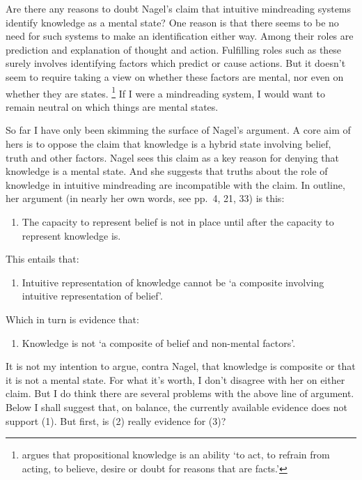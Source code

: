 \documentclass[11pt,a4paper]{extarticle}
\begin{document}
Are there any reasons to doubt  Nagel's claim that intuitive mindreading systems identify knowledge as a mental state?
One reason is that there seems to be no need for such systems to make an identification either way.
Among their roles are prediction and explanation of thought and action.
Fulfilling roles such as these surely involves identifying factors which predict or cause actions. 
But it doesn't seem to require taking a view on whether these factors are mental, nor even on whether they are states.%
\footnote{
\citet[p.\ 451]{Hyman:1999fk} argues that propositional knowledge is an ability `to act, to refrain from acting, to believe, desire or doubt for reasons that are facts.' 
}
If I were a mindreading system, I would want to remain neutral on which things are mental states.

So far I have only been skimming the surface of Nagel's argument.
A core aim of hers is to oppose the claim that knowledge is a hybrid state involving belief, truth and other factors.
Nagel sees this claim as a key reason for denying that knowledge is a mental state.
And she suggests that truths about the role of knowledge in intuitive mindreading are incompatible with the claim.
In outline, her argument (in nearly her own words, see pp.\ 4, 21, 33) is this:
%
\begin{enumerate}
\item The capacity to represent belief is not in place until after the capacity to represent knowledge is.
\end{enumerate}
This entails that:
\begin{enumerate}[resume]
\item Intuitive representation of knowledge cannot be `a composite involving intuitive representation of belief'.
\end{enumerate}
Which in turn is evidence that:
\begin{enumerate}[resume]
\item Knowledge is not `a composite of belief and non-mental factors'.
\end{enumerate}
%
It is not my intention to argue, contra Nagel, that knowledge is composite or that it is not a mental state.
For what it's worth,
I don't disagree with her on either claim.
But I do think there are several problems with the above line of argument.
Below I shall suggest that, on balance, the currently available evidence does not support (1).  
But first, is (2) really evidence for (3)?
\end{document}
